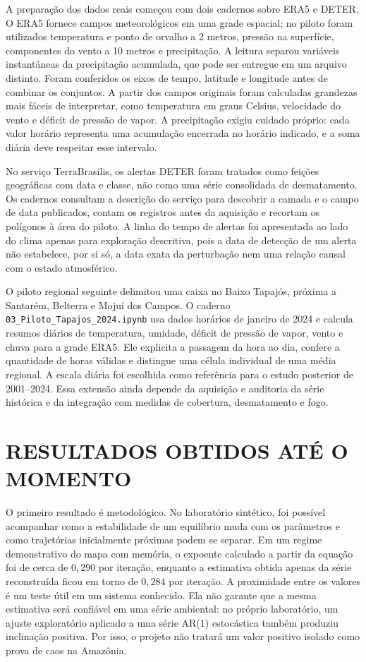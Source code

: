 \documentclass[12pt,a4paper]{article}
\begin{document}
A preparação dos dados reais começou com dois cadernos sobre ERA5 e DETER. O ERA5 fornece campos meteorológicos em uma grade espacial; no piloto foram utilizados temperatura e ponto de orvalho a 2 metros, pressão na superfície, componentes do vento a 10 metros e precipitação. A leitura separou variáveis instantâneas da precipitação acumulada, que pode ser entregue em um arquivo distinto. Foram conferidos os eixos de tempo, latitude e longitude antes de combinar os conjuntos. A partir dos campos originais foram calculadas grandezas mais fáceis de interpretar, como temperatura em graus Celsius, velocidade do vento e déficit de pressão de vapor. A precipitação exigiu cuidado próprio: cada valor horário representa uma acumulação encerrada no horário indicado, e a soma diária deve respeitar esse intervalo.

No serviço TerraBrasilis, os alertas DETER foram tratados como feições geográficas com data e classe, não como uma série consolidada de desmatamento. Os cadernos consultam a descrição do serviço para descobrir a camada e o campo de data publicados, contam os registros antes da aquisição e recortam os polígonos à área do piloto. A linha do tempo de alertas foi apresentada ao lado do clima apenas para exploração descritiva, pois a data de detecção de um alerta não estabelece, por si só, a data exata da perturbação nem uma relação causal com o estado atmosférico.

O piloto regional seguinte delimitou uma caixa no Baixo Tapajós, próxima a Santarém, Belterra e Mojuí dos Campos. O caderno \texttt{03\_Piloto\_Tapajos\_2024.ipynb} usa dados horários de janeiro de 2024 e calcula resumos diários de temperatura, umidade, déficit de pressão de vapor, vento e chuva para a grade ERA5. Ele explicita a passagem da hora ao dia, confere a quantidade de horas válidas e distingue uma célula individual de uma média regional. A escala diária foi escolhida como referência para o estudo posterior de 2001--2024. Essa extensão ainda depende da aquisição e auditoria da série histórica e da integração com medidas de cobertura, desmatamento e fogo.

\section*{RESULTADOS OBTIDOS ATÉ O MOMENTO}

O primeiro resultado é metodológico. No laboratório sintético, foi possível acompanhar como a estabilidade de um equilíbrio muda com os parâmetros e como trajetórias inicialmente próximas podem se separar. Em um regime demonstrativo do mapa com memória, o expoente calculado a partir da equação foi de cerca de \(0{,}290\) por iteração, enquanto a estimativa obtida apenas da série reconstruída ficou em torno de \(0{,}284\) por iteração. A proximidade entre os valores é um teste útil em um sistema conhecido. Ela não garante que a mesma estimativa será confiável em uma série ambiental: no próprio laboratório, um ajuste exploratório aplicado a uma série AR(1) estocástica também produziu inclinação positiva. Por isso, o projeto não tratará um valor positivo isolado como prova de caos na Amazônia.
\end{document}
